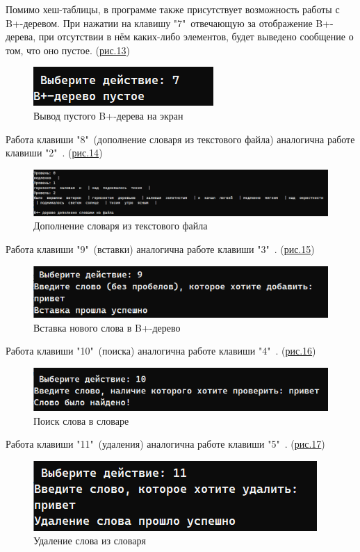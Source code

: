 \documentclass[11pt,a4paper,final]{article} %
\begin{document}
Помимо хеш-таблицы, в программе также присутствует возможность работы с B+-деревом. При нажатии на клавишу "7"\, отвечающую за отображение B+-дерева, при отсутствии в нём каких-либо элементов, будет выведено сообщение о том, что оно пустое. (\hyperref[fig:pic10]{рис.13})
\begin{figure}[H]
	\centering
	\includegraphics[width=0.35\linewidth]{img/pic10.png}
	\caption{Вывод пустого B+-дерева на экран}
	\label{fig:pic10}
\end{figure}

Работа клавиши "8"\ (дополнение словаря из текстового файла) аналогична работе клавиши "2"\ . (\hyperref[fig:pic11]{рис.14})
\begin{figure}[H]
	\centering
	\includegraphics[width=0.9\linewidth]{img/pic11.png}
	\caption{Дополнение словаря из текстового файла}
	\label{fig:pic11}
\end{figure}


Работа клавиши "9"\ (вставки) аналогична работе клавиши "3"\ . (\hyperref[fig:pic12]{рис.15})
\begin{figure}[H]
	\centering
	\includegraphics[width=0.8\linewidth]{img/pic12.png}
	\caption{Вставка нового слова в B+-дерево}
	\label{fig:pic12}
\end{figure}

Работа клавиши "10"\ (поиска) аналогична работе клавиши "4"\ . (\hyperref[fig:pic13]{рис.16})
\begin{figure}[H]
	\centering
	\includegraphics[width=0.8\linewidth]{img/pic13.png}
	\caption{Поиск слова в словаре}
	\label{fig:pic13}
\end{figure}
 
Работа клавиши "11"\ (удаления) аналогична работе клавиши "5"\ . (\hyperref[fig:pic14]{рис.17})
\begin{figure}[H]
	\centering
	\includegraphics[width=0.6\linewidth]{img/pic14.png}
	\caption{Удаление слова из словаря}
	\label{fig:pic14}
\end{figure}
\end{document}
